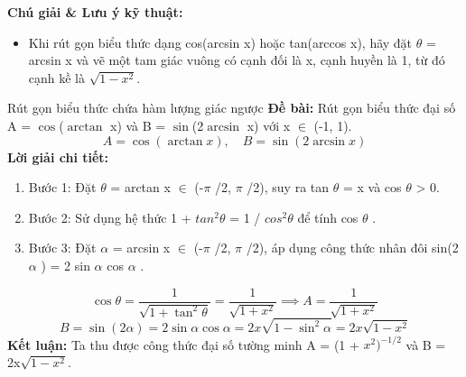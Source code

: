 \documentclass[11pt,a4paper,oneside]{book}
\begin{document}
\noindent\textbf{Chú giải \& Lưu ý kỹ thuật:}
\begin{itemize}[leftmargin=1.5em, itemsep=2pt]
  \item Khi rút gọn biểu thức dạng cos(arcsin x) hoặc tan(arccos x), hãy đặt $\theta$  = arcsin x và vẽ một tam giác vuông có cạnh đối là x, cạnh huyền là 1, từ đó cạnh kề là $\sqrt{1 - x^2}$.
\end{itemize}

\begin{vidu}{Rút gọn biểu thức chứa hàm lượng giác ngược}
\textbf{Đề bài:} Rút gọn biểu thức đại số A = $\cos$($\arctan$ x) và B = $\sin$(2$\arcsin$ x) với x $\in$ (-1, 1).
\[ A = \cos(\arctan x), \quad B = \sin(2\arcsin x) \]
\textbf{Lời giải chi tiết:}
\begin{enumerate}[leftmargin=1.5em, itemsep=2pt]
  \item Bước 1: Đặt $\theta$  = arctan x $\in$  (-$\pi$ /2, $\pi$ /2), suy ra tan $\theta$  = x và cos $\theta$  > 0.
  \item Bước 2: Sử dụng hệ thức 1 + $tan^2 \theta$  = 1 / $cos^2 \theta$  để tính cos $\theta$ .
  \item Bước 3: Đặt $\alpha$  = arcsin x $\in$  (-$\pi$ /2, $\pi$ /2), áp dụng công thức nhân đôi sin(2$\alpha$ ) = 2 sin $\alpha$  cos $\alpha$ .
\end{enumerate}
\[ \cos\theta = \frac{1}{\sqrt{1 + \tan^2\theta}} = \frac{1}{\sqrt{1 + x^2}} \implies A = \frac{1}{\sqrt{1 + x^2}} \]
\[ B = \sin(2\alpha) = 2\sin\alpha\cos\alpha = 2x\sqrt{1 - \sin^2\alpha} = 2x\sqrt{1 - x^2} \]
\noindent\textbf{Kết luận:} Ta thu được công thức đại số tường minh A = (1 + $x^2 )^{-1/2}$ và B = 2x$\sqrt{1 - x^2}$.
\end{vidu}
\end{document}
